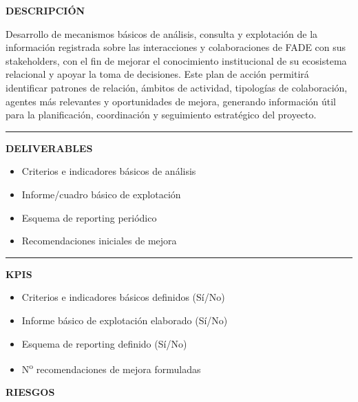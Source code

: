 \documentclass[11pt,a4paper]{scrreprt}
\newcommand{\fieldlabel}[1]{%
  {\footnotesize\sffamily\bfseries\color{mutedcolor}\MakeUppercase{#1}}\par\nopagebreak[4]
}
\newcommand{\fieldsep}{\vspace{3pt}\noindent\textcolor{bordercolor}{\rule{\linewidth}{0.4pt}}\vspace{3pt}\par}
\begin{document}
\begin{tcolorbox}[pabox={filcolor}{PA3.2 \enspace\textbullet\enspace Análisis y explotación de la información para la mejora de la gestión relacional de FADE}]

\fieldlabel{Descripci\'on}
{\small Desarrollo de mecanismos básicos de análisis, consulta y explotación de la información registrada sobre las interacciones y colaboraciones de FADE con sus stakeholders, con el fin de mejorar el conocimiento institucional de su ecosistema relacional y apoyar la toma de decisiones. Este plan de acción permitirá identificar patrones de relación, ámbitos de actividad, tipologías de colaboración, agentes más relevantes y oportunidades de mejora, generando información útil para la planificación, coordinación y seguimiento estratégico del proyecto. }\par
\fieldsep
\fieldlabel{Deliverables}
{\small \begin{itemize}[noitemsep,topsep=2pt]
\item Criterios e indicadores básicos de análisis
\item Informe/cuadro básico de explotación
\item Esquema de reporting periódico
\item Recomendaciones iniciales de mejora
\end{itemize}}\par
\fieldsep
\fieldlabel{KPIs}
{\small \begin{itemize}[noitemsep,topsep=2pt]
\item Criterios e indicadores básicos definidos (Sí/No)
\item Informe básico de explotación elaborado (Sí/No)
\item Esquema de reporting definido (Sí/No)
\item N\textsuperscript{o} recomendaciones de mejora formuladas
\end{itemize}}\par
\end{tcolorbox}
\begin{tcolorbox}[riskbox]
{\footnotesize\sffamily\bfseries\color{red!50!black} RIESGOS}\par{}
\end{tcolorbox}
\end{document}

